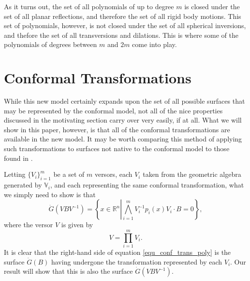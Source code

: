 \documentclass{ecgd-l}
\numberwithin{equation}{section}
\newcommand{\R}{\mathbb{R}}
\newcommand{\V}{\mathbb{V}}
\newcommand{\Gd}{\dot{G}}
\begin{document}
As it turns out, the set of all polynomials of up to degree $m$ is closed under
the set of all planar reflections, and therefore the set of all
rigid body motions.  This set of polynomials, however, is not closed under the
set of all spherical inversions, and thefore the set of all
transversions and dilations.  This is where some of the polynomials of degrees
between $m$ and $2m$ come into play.

\section{Conformal Transformations}

While this new model certainly expands upon the set of all possible surfaces that may
be represented by
the conformal model, not all of the nice properties discussed in the motivating section
carry over very easily, if at all.
What we will show in this paper, however, is that all of the conformal transformations
are available in the new model.  It may be worth comparing this method
of applying such transformations to surfaces not native to the conformal model
to those found in \cite{Sobczyk12,Lasenby05}.

Letting $\{V_i\}_{i=1}^m$ be a set of $m$ versors, each $V_i$ taken from the
geometric algebra generated by $\V_i$, and each representing the same
conformal transformation, what we simply need to show is that
\begin{equation}\label{equ_conf_trans_poly}
\Gd(VBV^{-1}) = \left\{x\in\R^n\left|\bigwedge_{i=1}^m V_i^{-1}p_i(x)V_i\cdot B=0\right\}\right.,
\end{equation}
where the versor $V$ is given by
\begin{equation*}
V = \prod_{i=1}^m V_i.
\end{equation*}
It is clear that the right-hand side of equation \eqref{equ_conf_trans_poly} is
the surface $\Gd(B)$ having undergone the transformation represented by each $V_i$.
Our result will show that this is also the surface $\Gd(VBV^{-1})$.
\end{document}
